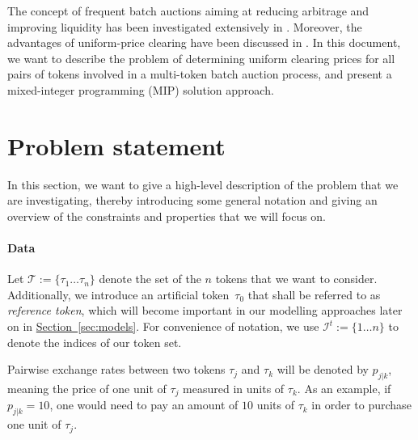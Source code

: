 \documentclass[11pt,parskip=full]{scrartcl}%
\newcommand*{\tokens}{\mathcal{T}}          %
\newcommand*{\secref}[1]{\hyperref[{#1}]{Section~\ref*{#1}}}
\begin{document}
The concept of frequent batch auctions aiming at reducing arbitrage and improving liquidity has
been investigated extensively in \cite{BUDISH-ET-AL_2015:HFT}.
Moreover, the advantages of uniform-price clearing have been discussed in 
\cite{ENGELBRECHT-KAHN_1998:multi-unit-auctions}.
In this document, we want to describe the problem of determining uniform clearing prices for all
pairs of tokens involved in a multi-token batch auction process, and present a mixed-integer
programming (MIP) solution approach.


\clearpage
\section{Problem statement}
\label{sec:problem}

In this section, we want to give a high-level description of the problem that we are investigating,
thereby introducing some general notation and giving an overview of the constraints and properties
that we will focus on.

\vspace{-.3cm}
\paragraph{Data}

Let $ \tokens := \{ \tau_1 \ldots \tau_n \} $ denote the set of the $ n $ tokens that we want to
consider.
Additionally, we introduce an artificial token~$ \tau_0 $ that shall be referred to as 
\emph{reference token}, which will become important in our modelling approaches later on in 
\secref{sec:models}.
For convenience of notation, we use $ \mathcal{I}^t := \{ 1 \ldots n \} $ to denote the indices
of our token set.

Pairwise exchange rates between two tokens $ \tau_j $ and $ \tau_k $ will be denoted by
$ p_{j|k} $, meaning the price of one unit of $ \tau_j $ measured in units of $ \tau_k $.
As an example, if $ p_{j|k} = 10 $, one would need to pay an amount of $ 10 $ units of $ \tau_k $
in order to purchase one unit of $ \tau_j $.
\end{document}
